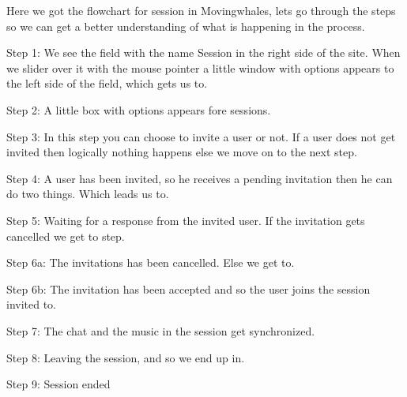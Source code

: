 Here we got the flowchart for session in Movingwhales, lets go through the steps so we can get a better understanding of what is happening in the process.
\begin{description}
\item{Step 1:} We see the field with the name Session in the right side of the site. When we slider over it with the mouse pointer a little window with options appears to the left side of the field, which gets us to.
\item{Step 2:} A little box with options appears fore sessions.
\item{Step 3:} In this step you can choose to invite a user or not. If a user does not get invited then logically nothing happens else we move on to the next step. 
\item{Step 4:} A user has been invited, so he receives a pending invitation then he can do two things. Which leads us to.
\item{Step 5:} Waiting for a response from the invited user. If the invitation gets cancelled we get to step.
\item{Step 6a:} The invitations has been cancelled. Else we get to.
\item{Step 6b:} The invitation has been accepted and so the user joins the session invited to.
\item{Step 7:} The chat and the music in the session get synchronized.
\item{Step 8:} Leaving the session, and so we end up in.
\item{Step 9:} Session ended
\end{description}